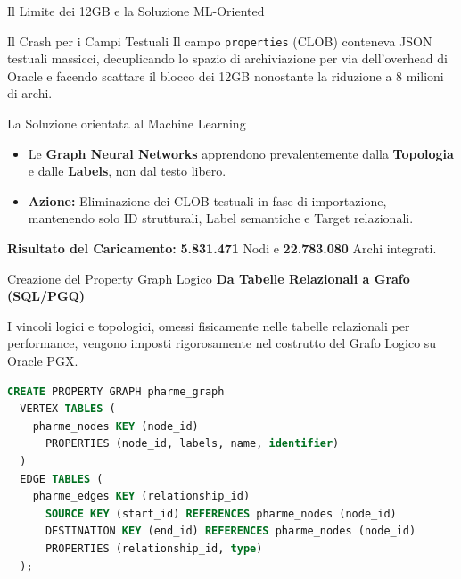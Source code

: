 \documentclass[aspectratio=169]{beamer}
\begin{document}
\begin{frame}{Il Limite dei 12GB e la Soluzione ML-Oriented}
    \begin{alertblock}{\faBan \hspace{0.2cm} Il Crash per i Campi Testuali}
        \small
        Il campo \texttt{properties} (CLOB) conteneva JSON testuali massicci, decuplicando lo spazio di archiviazione per via dell'overhead di Oracle e facendo scattare il blocco dei 12GB nonostante la riduzione a 8 milioni di archi.
    \end{alertblock}
    
    \vspace{0.2cm}
    
    \begin{exampleblock}{\faBrain \hspace{0.2cm} La Soluzione orientata al Machine Learning}
        \small
        \begin{itemize}
            \item Le \textbf{Graph Neural Networks} apprendono prevalentemente dalla \textbf{Topologia} e dalle \textbf{Labels}, non dal testo libero.
            \item \textbf{Azione:} Eliminazione dei CLOB testuali in fase di importazione, mantenendo solo ID strutturali, Label semantiche e Target relazionali.
        \end{itemize}
    \end{exampleblock}
    
    \vspace{0.2cm}
    \centering
    \faCheckCircle \hspace{0.1cm} \textbf{Risultato del Caricamento:} \textbf{5.831.471} Nodi e \textbf{22.783.080} Archi integrati.
\end{frame}

\begin{frame}[fragile]{Creazione del Property Graph Logico}
    \textbf{\faProjectDiagram \hspace{0.2cm} Da Tabelle Relazionali a Grafo (SQL/PGQ)}
    \small
    
    I vincoli logici e topologici, omessi fisicamente nelle tabelle relazionali per performance, vengono imposti rigorosamente nel costrutto del Grafo Logico su Oracle PGX.
    
    \vspace{0.2cm}
    \begin{lstlisting}[language=SQL, basicstyle=\ttfamily\scriptsize]
CREATE PROPERTY GRAPH pharme_graph
  VERTEX TABLES (
    pharme_nodes KEY (node_id)
      PROPERTIES (node_id, labels, name, identifier)
  )
  EDGE TABLES (
    pharme_edges KEY (relationship_id)
      SOURCE KEY (start_id) REFERENCES pharme_nodes (node_id)
      DESTINATION KEY (end_id) REFERENCES pharme_nodes (node_id)
      PROPERTIES (relationship_id, type)
  );
    \end{lstlisting}
\end{frame}
\end{document}
